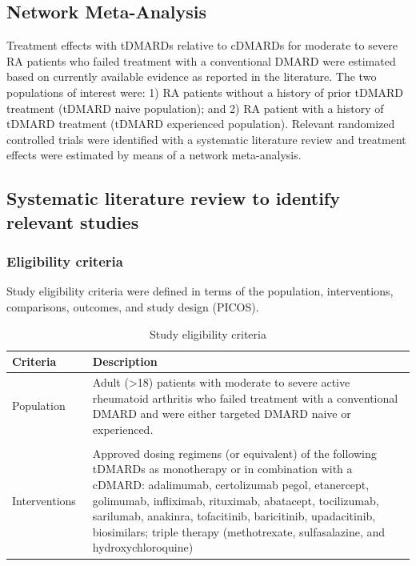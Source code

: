 \documentclass[11pt,final,fleqn]{article}
\theoremstyle{plain}
\begin{document}
\begin{appendices}
\section{Network Meta-Analysis}\label{appendix:NMA}
Treatment effects with tDMARDs relative to cDMARDs for moderate to severe RA patients who failed treatment with a conventional DMARD were estimated based on currently available evidence as reported in the literature. The two populations of interest were: 1) RA patients without a history of prior tDMARD treatment (tDMARD naive population); and 2) RA patient with a history of tDMARD treatment (tDMARD experienced population). Relevant randomized controlled trials were identified with a systematic literature review and treatment effects were estimated by means of a network meta-analysis.
\subsection{Systematic literature review to identify relevant studies}\label{systematic-literature-review}
\subsubsection{Eligibility criteria}
Study eligibility criteria were defined in terms of the population, interventions, comparisons, outcomes, and study design (PICOS).

\begin{table}[!ht]
\begin{center}
\scriptsize
\begin{threeparttable}
\caption{Study eligibility criteria} \label{tbl:study-eligibility}
\begin{tabular}{p{0.20\linewidth}p{0.80\linewidth}}
\hline
\multicolumn{1}{l}{Criteria} & \multicolumn{1}{l}{Description}\\
\hline
Population & Adult (>18) patients with moderate to severe active rheumatoid arthritis who failed treatment with a conventional DMARD and were either targeted DMARD naive or experienced. \\
&\\
Interventions & Approved dosing regimens (or equivalent) of the following tDMARDs as monotherapy or in combination with a cDMARD: adalimumab, certolizumab pegol, etanercept, golimumab, infliximab, rituximab, abatacept, tocilizumab, sarilumab, anakinra, tofacitinib, baricitinib, upadacitinib, biosimilars; triple therapy (methotrexate, sulfasalazine, and hydroxychloroquine)\\


\end{tabular}
\end{threeparttable}
\end{center}
\end{table}
\end{appendices}
\end{document}
